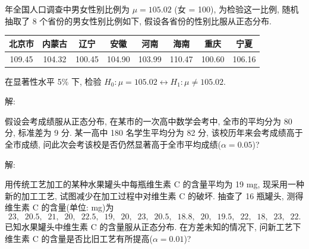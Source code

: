 \documentclass[standard]{ExBook}
\begin{document}
\begin{qitems}
    \begin{bbox}
    \begin{shaded}
         年全国人口调查中男女性别比例为 $\mu = 105.02$ (女 = 100), 为检验这一比例, 随机抽取了 8 个省份的男女性别比例如下, 假设各省份的性别比服从正态分布.
\begin{center}
\setlength{\tabcolsep}{14pt}
\begin{tabular}{cccccccc}
\hline
北京市 & 内蒙古 & 辽宁 & 安徽 & 河南 & 海南 & 重庆 & 宁夏 \\
\hline
109.45 & 104.32 & 100.45 & 104.90 & 103.99 & 110.47 & 100.60 & 106.16 \\
\hline
\end{tabular}
\end{center}
在显著性水平 5\% 下, 检验 $H_0 : \mu = 105.02 \longleftrightarrow H_1 : \mu \neq 105.02$.
    \end{shaded}
    \end{bbox}

\vspace{-5em}

    \begin{bbox}
解: 
    \end{bbox}

\vspace{-5em}

    \begin{bbox}
    \begin{shaded}
        \qitem
假设会考成绩服从正态分布, 在某市的一次高中数学会考中, 全市的平均分为 80 分, 标准差为 9 分. 某一高中 180 名学生平均分为 82 分, 该校历年来会考成绩高于全市成绩, 问此次会考该校是否仍然显著高于全市平均成绩($\alpha=0.05$)?
    \end{shaded}
    \end{bbox}

\vspace{-5em}

    \begin{bbox}
解: 
    \end{bbox}

\vspace{-5em}

    \begin{bbox}
    \begin{shaded}
        \qitem
用传统工艺加工的某种水果罐头中每瓶维生素 C 的含量平均为 19 mg, 现采用一种新的加工工艺, 试图减少在加工过程中对维生素 C 的破坏. 抽查了 16 瓶罐头, 测得维生素 C 的含量(单位: mg)为
$$23, \;\; 20.5, \;\; 21, \;\; 20, \;\; 22.5, \;\; 19, \;\; 20, \;\; 23, \;\; 20.5, \;\; 18.8, \;\; 20, \;\; 19.5, \;\; 22, \;\; 18, \;\; 23, \;\; 22.$$
已知水果罐头中维生素 C 的含量服从正态分布. 在方差未知的情况下, 问新工艺下维生素 C 的含量是否比旧工艺有所提高($\alpha=0.01$)?
    \end{shaded}
    \end{bbox}


\end{qitems}
\end{document}
